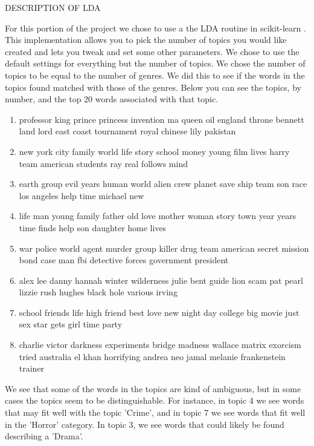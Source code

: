 \documentclass[11pt]{article}
\begin{document}
DESCRIPTION OF LDA

For this portion of the project we chose to use a the LDA routine in scikit-learn \cite{scikit-learn}. This implementation allows you to pick the number of topics you would like created and lets you tweak and set some other parameters. We chose to use the default settings for everything but the number of topics. We chose the number of topics to be equal to the number of genres. We did this to see if the words in the topics found matched with those of the genres. Below you can see the topics, by number, and the top 20 words associated with that topic.

{\small
\begin{enumerate}
\setlength\itemsep{0.0em}

\item professor king prince princess invention ma queen oil england throne bennett land lord east coast tournament royal chinese lily pakistan

\item new york city family world life story school money young film lives harry team american students ray real follows mind

\item earth group evil years human world alien crew planet save ship team son race los angeles help time michael new

\item life man young family father old love mother woman story town year years time finds help son daughter home lives

\item war police world agent murder group killer drug team american secret mission bond case man fbi detective forces government president

\item alex lee danny hannah winter wilderness julie bent guide lion scam pat pearl lizzie rush hughes black hole various irving

\item school friends life high friend best love new night day college big movie just sex star gets girl time party

\item charlie victor darkness experiments bridge madness wallace matrix exorcism tried australia el khan horrifying andrea neo jamal melanie frankenstein trainer
\end{enumerate}
}

We see that some of the words in the topics are kind of ambiguous, but in some cases the topics seem to be distinguishable. For instance, in topic 4 we see words that may fit well with the topic 'Crime', and in topic 7 we see words that fit well in the 'Horror' category. In topic 3, we see words that could likely be found describing a 'Drama'.
\end{document}
